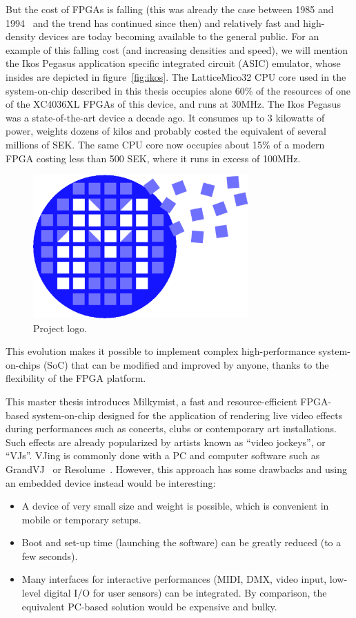 \documentclass[a4paper,11pt]{kthesis}
\begin{document}
But the cost of FPGAs is falling (this was already the case between 1985 and 1994~\cite{fpgacost} and the trend has continued since then) and relatively fast and high-density devices are today becoming available to the general public. For an example of this falling cost (and increasing densities and speed), we will mention the Ikos Pegasus application specific integrated circuit (ASIC) emulator, whose insides are depicted in figure~\ref{fig:ikos}. The LatticeMico32 CPU core used in the system-on-chip described in this thesis occupies alone 60\% of the resources of one of the XC4036XL FPGAs of this device, and runs at 30MHz. The Ikos Pegasus was a state-of-the-art device a decade ago. It consumes up to 3 kilowatts of power, weights dozens of kilos and probably costed the equivalent of several millions of SEK. The same CPU core now occupies about 15\% of a modern FPGA costing less than 500 SEK, where it runs in excess of 100MHz.

\begin{figure}
\centering
\includegraphics[height=55mm]{newlogo.eps}
\caption{Project logo.} \label{fig:projectlogo}
\end{figure}

This evolution makes it possible to implement complex high-performance system-on-chips (SoC) that can be modified and improved by anyone, thanks to the flexibility of the FPGA platform.

This master thesis introduces Milkymist\texttrademark \cite{milkymist}, a fast and resource-efficient FPGA-based system-on-chip designed for the application of rendering live video effects during performances such as concerts, clubs or contemporary art installations. Such effects are already popularized by artists known as ``video jockeys'', or ``VJs''. VJing is commonly done with a PC and computer software such as GrandVJ~\cite{grandvj} or Resolume~\cite{resolume}. However, this approach has some drawbacks and using an embedded device instead would be interesting:
\begin{itemize}
\item A device of very small size and weight is possible, which is convenient in mobile or temporary setups.
\item Boot and set-up time (launching the software) can be greatly reduced (to a few seconds).
\item Many interfaces for interactive performances (MIDI, DMX, video input, low-level digital I/O for user sensors) can be integrated. By comparison, the equivalent PC-based solution would be expensive and bulky.
\end{itemize}
\end{document}
